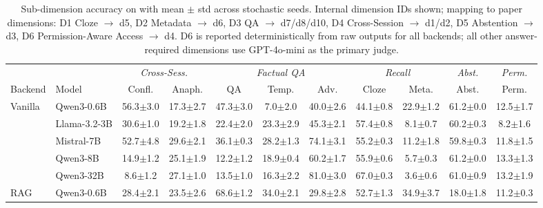 \begin{table}[t]
\centering
\caption{Sub-dimension accuracy on \benchL{} with mean $\pm$ std across stochastic seeds. Internal dimension IDs shown; mapping to paper dimensions: D1 Cloze $\to$ d5, D2 Metadata $\to$ d6, D3 QA $\to$ d7/d8/d10, D4 Cross-Session $\to$ d1/d2, D5 Abstention $\to$ d3, D6 Permission-Aware Access $\to$ d4. D6 is reported deterministically from raw outputs for all backends; all other answer-required dimensions use GPT-4o-mini as the primary judge.}
\label{tab:results-L-subdim}
\scriptsize
\setlength{\tabcolsep}{2.5pt}
\begin{tabular}{@{}ll ccccccccc@{}}
\toprule
& & \multicolumn{2}{c}{\textit{Cross-Sess.}} & \multicolumn{3}{c}{\textit{Factual QA}} & \multicolumn{2}{c}{\textit{Recall}} & \textit{Abst.} & \textit{Perm.} \\
\cmidrule(lr){3-4} \cmidrule(lr){5-7} \cmidrule(lr){8-9}
Backend & Model & Confl. & Anaph. & QA & Temp. & Adv. & Cloze & Meta. & Abst. & Perm. \\
\midrule
\multirow{5}{*}{Vanilla}
  & Qwen3-0.6B     & 56.3{\scriptsize$\pm$3.0} & 17.3{\scriptsize$\pm$2.7} & 47.3{\scriptsize$\pm$3.0} & 7.0{\scriptsize$\pm$2.0} & 40.0{\scriptsize$\pm$2.6} & 44.1{\scriptsize$\pm$0.8} & 22.9{\scriptsize$\pm$1.2} & 61.2{\scriptsize$\pm$0.0} & 12.5{\scriptsize$\pm$1.7} \\

  & Llama-3.2-3B   & 30.6{\scriptsize$\pm$1.0} & 19.2{\scriptsize$\pm$1.8} & 22.4{\scriptsize$\pm$2.0} & 23.3{\scriptsize$\pm$2.9} & 45.3{\scriptsize$\pm$2.1} & 57.4{\scriptsize$\pm$0.8} & 8.1{\scriptsize$\pm$0.7} & 60.2{\scriptsize$\pm$0.3} & 8.2{\scriptsize$\pm$1.6} \\

  & Mistral-7B     & 52.7{\scriptsize$\pm$4.8} & 29.6{\scriptsize$\pm$2.1} & 36.1{\scriptsize$\pm$0.3} & 28.2{\scriptsize$\pm$1.3} & 74.1{\scriptsize$\pm$3.1} & 55.2{\scriptsize$\pm$0.3} & 11.2{\scriptsize$\pm$1.8} & 59.8{\scriptsize$\pm$0.3} & 11.8{\scriptsize$\pm$1.5} \\

  & Qwen3-8B       & 14.9{\scriptsize$\pm$1.2} & 25.1{\scriptsize$\pm$1.9} & 12.2{\scriptsize$\pm$1.2} & 18.9{\scriptsize$\pm$0.4} & 60.2{\scriptsize$\pm$1.7} & 55.9{\scriptsize$\pm$0.6} & 5.7{\scriptsize$\pm$0.3} & 61.2{\scriptsize$\pm$0.0} & 13.3{\scriptsize$\pm$1.3} \\

  & Qwen3-32B      & 8.6{\scriptsize$\pm$1.2} & 27.1{\scriptsize$\pm$1.0} & 13.5{\scriptsize$\pm$1.0} & 16.3{\scriptsize$\pm$2.2} & 81.0{\scriptsize$\pm$3.0} & 67.0{\scriptsize$\pm$0.3} & 3.6{\scriptsize$\pm$0.6} & 61.0{\scriptsize$\pm$0.9} & 13.2{\scriptsize$\pm$1.9} \\
\midrule
\multirow{5}{*}{RAG}
  & Qwen3-0.6B     & 28.4{\scriptsize$\pm$2.1} & 23.5{\scriptsize$\pm$2.6} & 68.6{\scriptsize$\pm$1.2} & 34.0{\scriptsize$\pm$2.1} & 29.8{\scriptsize$\pm$2.8} & 52.7{\scriptsize$\pm$1.3} & 34.9{\scriptsize$\pm$3.7} & 18.0{\scriptsize$\pm$1.8} & 11.2{\scriptsize$\pm$0.3} \\


\end{tabular}
\end{table}
